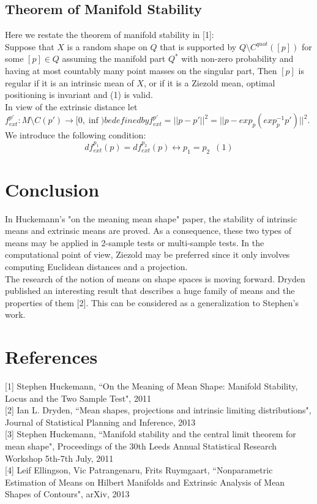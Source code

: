 \documentclass[12pt]{article}
\theoremstyle{definition}
\theoremstyle{remark}
\numberwithin{equation}{section}
\begin{document}
\subsection*{Theorem of Manifold Stability}
Here we restate the theorem of manifold stability in [1]:\\[0.2cm]
\indent Suppose that $X$ is a random shape on $Q$ that is supported by $Q \setminus C^{quot}([p])$ for some $[p] \in Q$ assuming the manifold part $Q^\ast$ with non-zero probability and having at most countably many point masses on the singular part, Then $[p]$ is regular if it is an intrinsic mean of $X$, or if it is a Ziezold mean, optimal positioning is invariant and (1) is valid.\\[0.2cm]
\indent In view of the extrinsic distance let $f_{ext}^{p'}: M \setminus C(p') \rightarrow [0,\inf) be defined by f_{ext}^{p'} = ||p-p'||^2=||p-exp_p(exp_p^{-1}p')||^2$. We introduce the following condition:
\[df_{ext}^{p_1}(p)=df_{ext}^{p_2}(p)\leftrightarrow p_1 = p_2\,\,\,(1)\]
\section{Conclusion}
In Huckemann's "on the meaning mean shape" paper, the stability of intrinsic means and extrinsic means are proved. As a consequence, these two types of means may be applied in 2-sample tests or multi-sample tests. In the computational point of view, Ziezold may be preferred since it only involves computing Euclidean distances and a projection. \\[0.2cm]
\indent The research of the notion of means on shape spaces is moving forward. Dryden published an interesting result that describes a huge family of means and the properties of them [2]. This can be considered as a generalization to Stephen's work.
\section{References}
[1] Stephen Huckemann, ``On the Meaning of Mean Shape: Manifold Stability, Locus and the Two Sample Test", 2011\\[0.2cm]
[2] Ian L. Dryden, ``Mean shapes, projections and intrinsic limiting distributions", Journal of Statistical Planning and Inference, 2013\\[0.2cm]
[3] Stephen Huckemann, ``Manifold stability and the central limit theorem for mean shape", Proceedings of the 30th Leeds Annual Statistical Research Workshop 5th-7th July, 2011\\[0.2cm]
[4] Leif Ellingson, Vic Patrangenaru, Frits Ruymgaart, ``Nonparametric Estimation of Means on Hilbert Manifolds and Extrinsic Analysis of Mean Shapes of Contours", arXiv, 2013\\[0.2cm]
\end{document}
